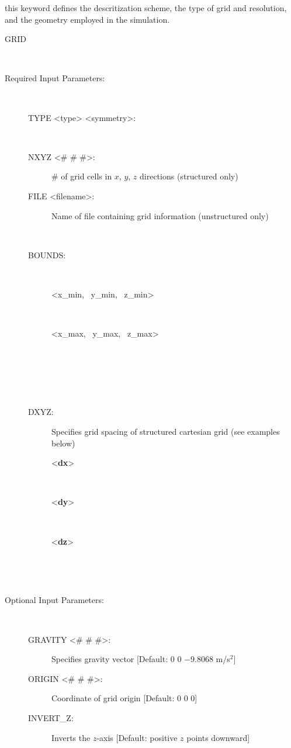  this keyword defines the descritization scheme, the type of grid and resolution, and the geometry employed in the simulation.

\begin{description}
\item[GRID]~
\item[Required Input Parameters:]~

\begin{description}
\item[TYPE <type> <symmetry>:] ~


\item[NXYZ <\# \# \#>:] \# of grid cells in $x$, $y$, $z$ directions (structured only)

\item[FILE <filename>:] Name of file containing grid information (unstructured only)

~\\

\noindent
\item[BOUNDS:] ~
\begin{description}
\item[<x\_min, \ y\_min, \ z\_min>]~
\item[<x\_max, \ y\_max, \ z\_max>]~
\end{description}
\item[\keyend] ~

~\\

\item[DXYZ:] Specifies grid spacing of structured cartesian grid (see examples below)
\begin{description}
\item[<{\bf dx}>] ~
\item[<{\bf dy}>] ~
\item[<{\bf dz}>] ~
\end{description}
\item[\keyend] ~
\end{description}

\item[Optional Input Parameters:] ~

\begin{description}

\item[GRAVITY <\# \# \#>:] Specifies gravity vector [Default: 0 0 $-$9.8068 m/s$^2$]

\item[ORIGIN <\# \# \#>:] Coordinate of grid origin [Default: 0 0 0]

\item[INVERT\_Z:] Inverts the $z$-axis [Default: positive $z$ points downward]
\end{description}
\end{description}

